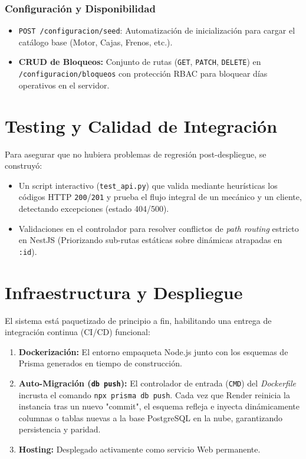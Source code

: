 \documentclass[12pt,a4paper]{article}
\begin{document}
\subsubsection{Configuración y Disponibilidad}
\begin{itemize}
    \item \texttt{POST /configuracion/seed}: Automatización de inicialización para cargar el catálogo base (Motor, Cajas, Frenos, etc.).
    \item \textbf{CRUD de Bloqueos:} Conjunto de rutas (\texttt{GET}, \texttt{PATCH}, \texttt{DELETE}) en \texttt{/configuracion/bloqueos} con protección RBAC para bloquear días operativos en el servidor.
\end{itemize}

\section{Testing y Calidad de Integración}
Para asegurar que no hubiera problemas de regresión post-despliegue, se construyó:
\begin{itemize}
    \item Un script interactivo (\texttt{test\_api.py}) que valida mediante heurísticas los códigos HTTP \texttt{200}/\texttt{201} y prueba el flujo integral de un mecánico y un cliente, detectando excepciones (estado 404/500).
    \item Validaciones en el controlador para resolver conflictos de \textit{path routing} estricto en NestJS (Priorizando sub-rutas estáticas sobre dinámicas atrapadas en \texttt{:id}).
\end{itemize}

\section{Infraestructura y Despliegue}
El sistema está paquetizado de principio a fin, habilitando una entrega de integración continua (CI/CD) funcional:
\begin{enumerate}
    \item \textbf{Dockerización:} El entorno empaqueta Node.js junto con los esquemas de Prisma generados en tiempo de construcción.
    \item \textbf{Auto-Migración (\texttt{db push}):} El controlador de entrada (\texttt{CMD}) del \textit{Dockerfile} incrusta el comando \texttt{npx prisma db push}. Cada vez que Render reinicia la instancia tras un nuevo "commit", el esquema refleja e inyecta dinámicamente columnas o tablas nuevas a la base PostgreSQL en la nube, garantizando persistencia y paridad.
    \item \textbf{Hosting:} Desplegado activamente como servicio Web permanente.
\end{enumerate}
\end{document}
